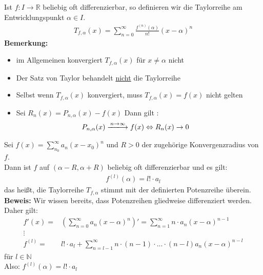 \begin{Definition}{
	Ist $f: I \rightarrow \mathbb{R}$ beliebig oft differenzierbar, so definieren 
	wir die Taylorreihe am Entwicklungspunkt $\alpha \in I$.
	\begin{align*}
		T_{f, \alpha} (x) = \sum_{n = 0}^{\infty} \frac{f^{(n)}(\alpha)}{n!}
		(x- \alpha)^n
	\end{align*}
	\textbf{Bemerkung:} 
	\begin{itemize}
		\item im Allgemeinen konvergiert $T_{f,\alpha}(x)$ für $x \neq \alpha$ nicht
		\item Der Satz von Taylor behandelt \underline{nicht} die Taylorreihe
		\item Selbst wenn $T_{f, \alpha}(x)$ konvergiert, muss 
		$T_{f,\alpha}(x) = f(x)$ nicht gelten
		\item Sei $R_n(x) = P_{n, \alpha}(x) -f(x)$ Dann gilt :
		\begin{align*}
			P_{n,\alpha}(x) \xlongrightarrow{n \rightarrow \infty} f(x) 
			& \Leftrightarrow  R_n (x) \rightarrow 0
		\end{align*}
	\end{itemize}
}\end{Definition}

\begin{Satz}{
	Sei $f(x) = \sum_{n_0}^{\infty} a_n (x- x_0)^n $ und $R > 0$ der zugehörige 
	Konvergenzradius von $f$.\\
	Dann ist $f$ auf $(\alpha -R, \alpha + R)$ beliebig oft differenzierbar und 
	es gilt:
	\begin{align*}
		f^{(l)}(\alpha) = l ! \cdot a_l
	\end{align*}
	das heißt, die Taylorreihe $T_{f,\alpha}$ stimmt mit der definierten 
	Potenzreihe überein.
	\\
	\textbf{Beweis:} Wir wissen bereits, dass Potenzreihen gliedweise differenziert
	 werden. Daher gilt: 
	 \begin{align*}
	 	f'(x) = & \left( \sum_{n = 0}^{\infty} a_n (x- \alpha)^n \right) '
	 	 =  \sum_{n= 1}^{\infty}n \cdot a_n (x- \alpha)^{n-1} \\
	 	\vdots \\
	 	f^{(l)} = & l! \cdot a_l + \sum_{n = l-1}^{\infty} n \cdot (n-1) \cdot 
	 	... \cdot (n-l) a_n(x-\alpha)^{n-l}
	 \end{align*}
	 für $l \in \mathbb{N}$ \\
	 Also: $f^{(l)}(\alpha) = l! \cdot a_l$
}\end{Satz}

